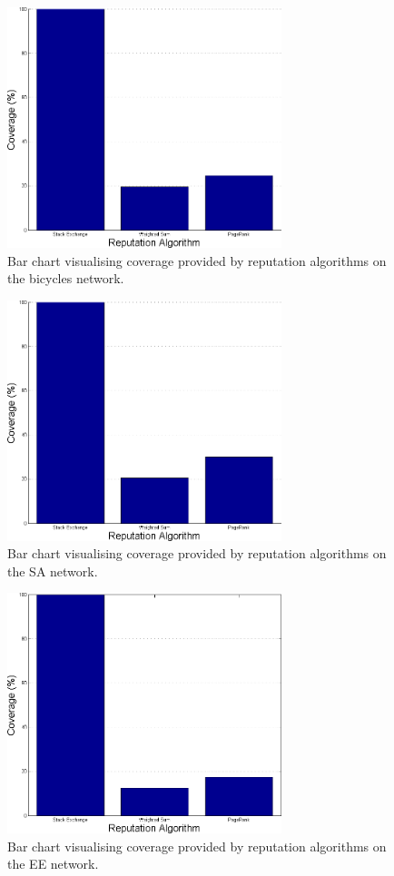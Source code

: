 \documentclass[]{final_report}
\begin{document}
\begin{figure}[ht!]
\centering
\includegraphics[width=80mm]{chap5/bicycles_coverage.png}
\caption{Bar chart visualising coverage provided by reputation algorithms on the bicycles network.}
\label{gra:bicoverage}
\end{figure}

\begin{figure}[ht!]
\centering
\includegraphics[width=80mm]{chap5/cooking_coverage.png}
\caption{Bar chart visualising coverage provided by reputation algorithms on the SA network.}
\label{gra:sacoverage}
\end{figure}

\begin{figure}[ht!]
\centering
\includegraphics[width=80mm]{chap5/electronics_coverage.png}
\caption{Bar chart visualising coverage provided by reputation algorithms on the EE network.}
\label{gra:eecoverage}
\end{figure}
\end{document}
